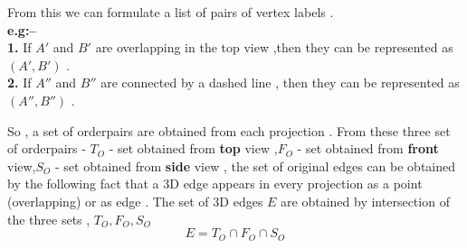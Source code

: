 \documentclass{article}
\begin{document}
\hspace{15mm} From this we can formulate a list of pairs of vertex labels .\\
\textbf{e.g:--} \\\textbf{1.} If $A'$ and $B'$ are overlapping in the top view ,then they can be represented as $(A',B')$ .\\
\hspace{15mm} \textbf{2.} If $A''$ and $B''$ are connected by a dashed line , then they can be represented as $(A'',B'')$ .

So , a set of orderpairs are obtained from each projection . From these three set of orderpairs - $T_{O}$ - set obtained from \textbf{top} view ,$F_{O}$ - set obtained from \textbf{front} view,$S_{O}$ - set obtained from \textbf{side} view , the set of original edges can be obtained by the following fact that a 3D edge appears in every projection as a point (overlapping) or as edge . The set of 3D edges $E$ are obtained by intersection of the three sets , $T_{O} ,F_{O} ,S_{O}$
\begin{equation}
E = T_O \cap F_O \cap S_O
\end{equation}
\end{document}
